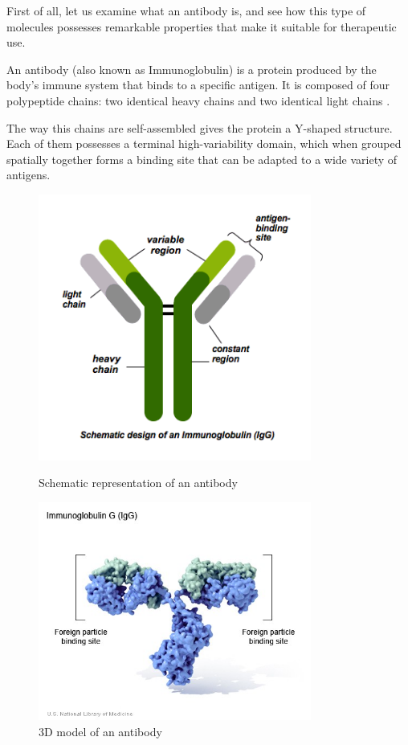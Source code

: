 First of all, let us examine what an antibody is, and see how this
type of molecules possesses remarkable properties that make it suitable
for therapeutic use.

An antibody (also known as Immunoglobulin) is a protein produced by the 
body's immune system that binds to a specific antigen. It is composed of four
polypeptide chains: two identical heavy chains 
and two identical light chains \cite{davies_antibody_1993}. 

The way this chains are self-assembled gives the protein a Y-shaped structure. 
Each of them possesses a terminal high-variability domain, which when grouped spatially
together forms a binding site that can be adapted to a wide variety of antigens.

\begin{figure}[H]
    \begin{minipage}{0.495\textwidth}
        \centering
        \includegraphics[width=0.8\textwidth]{../Images/schematics_antibody.png}
        \caption{Schematic representation of an antibody} 
        \label{fig:schematics_antibody}
    \end{minipage}\hfill
    \begin{minipage}{0.495\textwidth}
        \centering
        \includegraphics[width=0.8\textwidth]{../Images/immunoglobulin_3D_model.jpg}   
        \caption{3D model of an antibody}
        \label{fig:immunoglobulin_3D_model}
    \end{minipage}
\end{figure}


